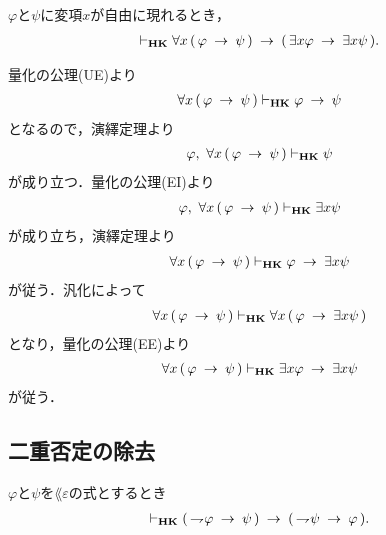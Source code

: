 	\begin{screen}
		\begin{thm}
			$\varphi$と$\psi$に変項$x$が自由に現れるとき，
			\begin{align}
				\vdash_{{\scriptsize \mbox{{\bf HK}}}} \forall x\, (\, \varphi \hspace{0.25em}\rightarrow\hspace{0.25em} \psi\, )
				\hspace{0.25em}\rightarrow\hspace{0.25em} (\, \exists x \varphi \hspace{0.25em}\rightarrow\hspace{0.25em} \exists x \psi\, ).
			\end{align}
		\end{thm}
	\end{screen}
	
	\begin{sketch}
		量化の公理(UE)より
		\begin{align}
			\forall x\, (\, \varphi \hspace{0.25em}\rightarrow\hspace{0.25em} \psi\, ) \vdash_{{\scriptsize \mbox{{\bf HK}}}}
			\varphi \hspace{0.25em}\rightarrow\hspace{0.25em} \psi
		\end{align}
		となるので，演繹定理より
		\begin{align}
			\varphi,\ \forall x\, (\, \varphi \hspace{0.25em}\rightarrow\hspace{0.25em} \psi\, ) 
			\vdash_{{\scriptsize \mbox{{\bf HK}}}} \psi
		\end{align}
		が成り立つ．量化の公理(EI)より
		\begin{align}
			\varphi,\ \forall x\, (\, \varphi \hspace{0.25em}\rightarrow\hspace{0.25em} \psi\, ) 
			\vdash_{{\scriptsize \mbox{{\bf HK}}}} \exists x \psi
		\end{align}
		が成り立ち，演繹定理より
		\begin{align}
			\forall x\, (\, \varphi \hspace{0.25em}\rightarrow\hspace{0.25em} \psi\, ) 
			\vdash_{{\scriptsize \mbox{{\bf HK}}}} \varphi \hspace{0.25em}\rightarrow\hspace{0.25em} \exists x \psi
		\end{align}
		が従う．汎化によって
		\begin{align}
			\forall x\, (\, \varphi \hspace{0.25em}\rightarrow\hspace{0.25em} \psi\, ) \vdash_{{\scriptsize \mbox{{\bf HK}}}} 
			\forall x\, (\, \varphi \hspace{0.25em}\rightarrow\hspace{0.25em} \exists x \psi\, )
		\end{align}
		となり，量化の公理(EE)より
		\begin{align}
			\forall x\, (\, \varphi \hspace{0.25em}\rightarrow\hspace{0.25em} \psi\, ) \vdash_{{\scriptsize \mbox{{\bf HK}}}} 
			\exists x \varphi \hspace{0.25em}\rightarrow\hspace{0.25em} \exists x \psi
		\end{align}
		が従う．
		\QED
	\end{sketch}

\subsection{二重否定の除去}
	\begin{screen}
		\begin{thm}[対偶律3]\label{classic:contraposition_3}
			$\varphi$と$\psi$を$\lang{\varepsilon}$の式とするとき
			\begin{align}
				\vdash_{{\scriptsize \mbox{{\bf HK}}}} (\, \rightharpoondown\hspace{-0.25em} \varphi \hspace{0.25em}\rightarrow\hspace{0.25em} \psi\, )
				\hspace{0.25em}\rightarrow\hspace{0.25em} (\, \rightharpoondown\hspace{-0.25em} \psi \hspace{0.25em}\rightarrow\hspace{0.25em} \varphi\, ).
			\end{align}
		\end{thm}
	\end{screen}
	
